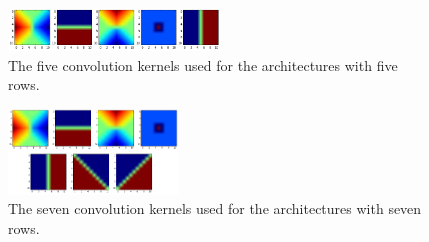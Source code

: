 \documentclass[a4paper,onecolumn]{report}
\begin{document}
\begin{appendices}
\begin{figure}[h!]
	\centering
	\includegraphics[width=0.5\textwidth]{./images/5filters.jpg}
	\caption{The five convolution kernels used for the architectures with five rows.}
	\label{fig:5filters}
\end{figure}

\begin{figure}[h!]
	\centering
	\includegraphics[width=0.4\textwidth]{./images/7filters.jpg}
	\caption{The seven convolution kernels used for the architectures with seven rows.}
	\label{fig:7filters}
\end{figure}

\end{appendices}
\end{document}
